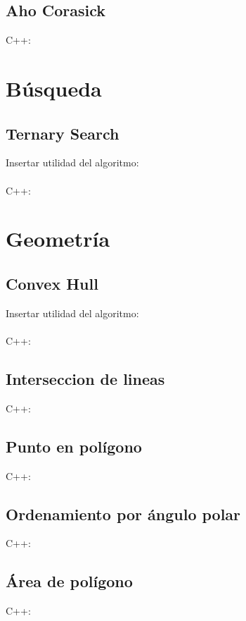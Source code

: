 \documentclass{article}
\begin{document}
    \subsection{Aho Corasick}
        C++:
        
\pagebreak
\section{Búsqueda}
    \subsection{Ternary Search}
        Insertar utilidad del algoritmo:
        \\ \\
        C++:
        
\pagebreak
\section{Geometría}
    \subsection{Convex Hull}
        Insertar utilidad del algoritmo:
        \\ \\
        C++:
        
    \subsection{Interseccion de lineas}
        C++:
        
    \subsection{Punto en polígono}
        C++:
        
    \subsection{Ordenamiento por ángulo polar}
        C++:
        
    \subsection{Área de polígono}
        C++:
        
      
\end{document}
